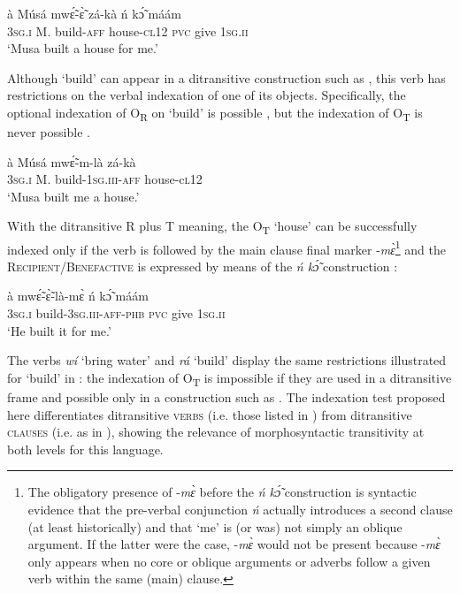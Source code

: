 \documentclass[output=paper]{langsci/langscibook}
\begin{document}
\ea
\label{ex:6.pacchiarotti}
\gll à    Músá  mwɛ̃́-ɛ̃̀    zá-kà    ń  kɔ̃́  máám \\
\textsc{3sg.i}    M.  build-\textsc{aff}  house\textsc{-cl12}  \textsc{pvc}  give  \textsc{1sg.ii}\\
\glt`Musa built a house for me.'
\z

Although `build' can appear in a ditransitive construction such as , this verb has restrictions on the verbal indexation of one of its objects. Specifically, the optional indexation of O\textsubscript{R} on `build' is possible , but the indexation of O\textsubscript{T} is never possible .

\ea
\label{ex:7.pacchiarotti}
\gll à    Músá  mwɛ̃́-m-là    zá-kà\\
\textsc{3sg.i}    M.  build-\textsc{1sg.iii-aff}  house-c\textsc{l12}\\
\glt `Musa built me a house.'
\z
 
\z


With the ditransitive R plus T meaning, the O\textsubscript{T} `house' can be successfully indexed only if the verb is followed by the main clause final marker -\textit{m\`{ɛ}}\footnote{The obligatory presence of -\textit{m\`{ɛ}} before the \textit{ń k\'{\~{ɔ}}} construction is syntactic evidence that the pre-verbal conjunction \textit{ń} actually introduces a second clause (at least historically) and that `me' is (or was) not simply an oblique argument. If the latter were the case, -\textit{m\`{ɛ}} would not be present because -\textit{m\`{ɛ}} only appears when no core or oblique arguments or adverbs follow a given verb within the same (main) clause.}{} and the \textsc{Recipient/Benefactive} is expressed by means of the \textit{ń k\'{\~{ɔ}}} construction :

\ea
\label{ex:9.pacchiarotti}
\gll à    mwɛ̃́-ɛ̃̀-là-mɛ̀      ń  kɔ̃́  máám \\
\textsc{3sg.i}    build-\textsc{3sg.iii-aff-phb}  \textsc{pvc}  give \textsc{  1sg.ii} \\
\glt `He built it for me.'
\z

The verbs \textit{wí} `bring water' and \textit{rá} `build' display the same restrictions illustrated for `build' in : the indexation of O\textsubscript{T} is impossible if they are used in a ditransitive frame and possible only in a construction such as . The indexation test proposed here differentiates ditransitive \textsc{verbs} (i.e. those listed in ) from ditransitive \textsc{clauses} (i.e. as in ), showing the relevance of morphosyntactic transitivity at both levels for this language.
\end{document}
